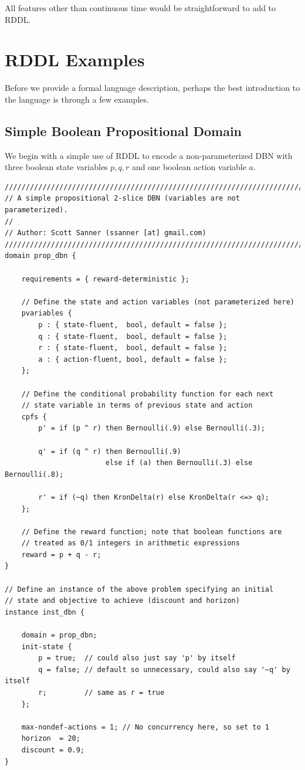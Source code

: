 \documentclass[11pt,a4paper]{article}
\begin{document}
All features other than continuous time would be straightforward to add to 
RDDL. %

\section{RDDL Examples}

Before we provide a formal language description, 
perhaps the best introduction to the language is through a
few examples.

\subsection{Simple Boolean Propositional Domain}

We begin with a simple use of RDDL to encode a non-parameterized
DBN with three boolean state variables $p,q,r$ and one boolean
action variable $a$.

\newpage
\begin{lstlisting}[title=dbn\_prop.rddl]
////////////////////////////////////////////////////////////////////////
// A simple propositional 2-slice DBN (variables are not parameterized).
//
// Author: Scott Sanner (ssanner [at] gmail.com)
////////////////////////////////////////////////////////////////////////
domain prop_dbn {
  	
	requirements = { reward-deterministic };
      	
	// Define the state and action variables (not parameterized here)
	pvariables { 
		p : { state-fluent,  bool, default = false };
		q : { state-fluent,  bool, default = false };
		r : { state-fluent,  bool, default = false }; 
		a : { action-fluent, bool, default = false }; 
	};
  
	// Define the conditional probability function for each next
	// state variable in terms of previous state and action
	cpfs {
		p' = if (p ^ r) then Bernoulli(.9) else Bernoulli(.3);
						
		q' = if (q ^ r) then Bernoulli(.9) 
						else if (a) then Bernoulli(.3) else Bernoulli(.8);

		r' = if (~q) then KronDelta(r) else KronDelta(r <=> q);										
	};
    	
	// Define the reward function; note that boolean functions are 
	// treated as 0/1 integers in arithmetic expressions
	reward = p + q - r; 
}
        
// Define an instance of the above problem specifying an initial
// state and objective to achieve (discount and horizon)
instance inst_dbn {

	domain = prop_dbn;	
	init-state { 
		p = true;  // could also just say 'p' by itself 
		q = false; // default so unnecessary, could also say '~q' by itself
		r;         // same as r = true
	};
  
	max-nondef-actions = 1; // No concurrency here, so set to 1
	horizon  = 20;
	discount = 0.9;
}
\end{lstlisting}
\end{document}
